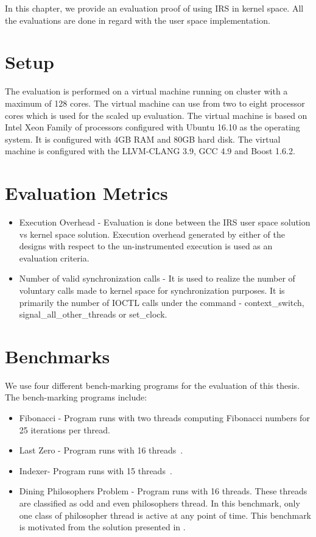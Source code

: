 In this chapter, we provide an evaluation proof of using IRS in kernel space. 
All the evaluations are done in regard with the user space implementation. 

\section{Setup}

The evaluation is performed on a virtual machine running on cluster with a maximum of 128 cores. 
The virtual machine can use from two to eight processor cores which is used for the scaled up evaluation. 
The virtual machine is based on Intel Xeon Family of processors configured with Ubuntu 16.10 as the operating system. 
It is configured with 4GB RAM and 80GB hard disk. 
The virtual machine is configured with the LLVM-CLANG 3.9, GCC 4.9 and Boost 1.6.2.


\section{Evaluation Metrics}

\begin{itemize}
\item{Execution Overhead} - Evaluation is done between the IRS user space solution vs kernel space solution. 
Execution overhead generated by either of the designs with respect to the un-instrumented execution is used as an evaluation criteria.
\item{Number of valid synchronization calls} - It is used to realize the number of voluntary calls made to kernel space for synchronization purposes. 
It is primarily the number of IOCTL calls under the command - context\_switch, signal\_all\_other\_threads or set\_clock.
\end{itemize}


\section{Benchmarks}

We use four different bench-marking programs for the evaluation of this thesis. 
The bench-marking programs include:
\begin{itemize}
\item{Fibonacci} - Program runs with two threads computing Fibonacci numbers for 25 iterations per thread.
\item{Last Zero} - Program runs with 16 threads~\citep{abdulla2014optimal}.
\item{Indexer}- Program runs with 15 threads~\citep{dynamic_por}.
\item{Dining Philosophers Problem} - Program runs with 16 threads. These threads are classified as odd and even philosophers thread. 
In this benchmark, only one class of philosopher thread is active at any point of time. 
This benchmark is motivated from the solution presented in \citet{silberschatz2014operating}.
\end{itemize}

